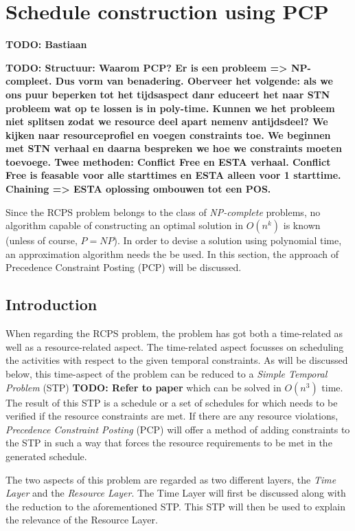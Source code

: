 \documentclass{article}
\newcommand{\TODO}[1]{{\color{red}\textbf{TODO: #1}}}
\begin{document}
\newpage

\section{Schedule construction using PCP}
\TODO{Bastiaan}

\TODO{Structuur: Waarom PCP? Er is een probleem => NP-compleet. Dus vorm van benadering. Oberveer het volgende: als we ons puur beperken tot het tijdsaspect danr educeert het naar STN probleem wat op te lossen is in poly-time. Kunnen we het probleem niet splitsen zodat we resource deel apart nemenv antijdsdeel? We kijken naar resourceprofiel en voegen constraints toe. We beginnen met STN verhaal en daarna bespreken we hoe we constraints moeten toevoege. Twee methoden: Conflict Free en ESTA verhaal. Conflict Free is feasable voor alle starttimes en ESTA alleen voor 1 starttime. Chaining => ESTA oplossing ombouwen tot een POS.}

Since the RCPS problem belongs to the class of \emph{NP-complete} problems, no algorithm capable of constructing an optimal solution in $O(n^k)$ is known (unless of course, $P=NP$). In order to devise a solution using polynomial time, an approximation algorithm needs the be used. In this section, the approach of Precedence Constraint Posting (PCP) will be discussed.

\subsection{Introduction}
When regarding the RCPS problem, the problem has got both a time-related as well as a resource-related aspect. 
The time-related aspect focusses on scheduling the activities with respect to the given temporal constraints. 
As will be discussed below, this time-aspect of the problem can be reduced to a \emph{Simple Temporal Problem} (STP) \TODO{Refer to paper} which can be solved in $O(n^3)$ time. 
The result of this STP is a schedule or a set of schedules for which needs to be verified if the resource constraints are met. 
If there are any resource violations, \emph{Precedence Constraint Posting} (PCP) will offer a method of adding constraints to the STP in such a way that forces the resource requirements to be met in the generated schedule. 

The two aspects of this problem are regarded as two different layers, the \emph{Time Layer} and the \emph{Resource Layer}.
The Time Layer will first be discussed along with the reduction to the aforementioned STP. 
This STP will then be used to explain the relevance of the Resource Layer.
\end{document}

